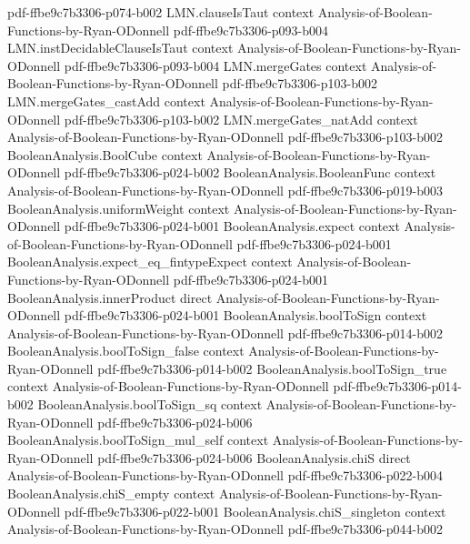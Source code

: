 \begin{lemma}
  {pdf-ffbe9c7b3306-p074-b002}
\proofstep
  {LMN.clauseIsTaut}
  {context}
  {Analysis-of-Boolean-Functions-by-Ryan-ODonnell}
  {pdf-ffbe9c7b3306-p093-b004}
\proofstep
  {LMN.instDecidableClauseIsTaut}
  {context}
  {Analysis-of-Boolean-Functions-by-Ryan-ODonnell}
  {pdf-ffbe9c7b3306-p093-b004}
\proofstep
  {LMN.mergeGates}
  {context}
  {Analysis-of-Boolean-Functions-by-Ryan-ODonnell}
  {pdf-ffbe9c7b3306-p103-b002}
\proofstep
  {LMN.mergeGates_castAdd}
  {context}
  {Analysis-of-Boolean-Functions-by-Ryan-ODonnell}
  {pdf-ffbe9c7b3306-p103-b002}
\proofstep
  {LMN.mergeGates_natAdd}
  {context}
  {Analysis-of-Boolean-Functions-by-Ryan-ODonnell}
  {pdf-ffbe9c7b3306-p103-b002}
\proofstep
  {BooleanAnalysis.BoolCube}
  {context}
  {Analysis-of-Boolean-Functions-by-Ryan-ODonnell}
  {pdf-ffbe9c7b3306-p024-b002}
\proofstep
  {BooleanAnalysis.BooleanFunc}
  {context}
  {Analysis-of-Boolean-Functions-by-Ryan-ODonnell}
  {pdf-ffbe9c7b3306-p019-b003}
\proofstep
  {BooleanAnalysis.uniformWeight}
  {context}
  {Analysis-of-Boolean-Functions-by-Ryan-ODonnell}
  {pdf-ffbe9c7b3306-p024-b001}
\proofstep
  {BooleanAnalysis.expect}
  {context}
  {Analysis-of-Boolean-Functions-by-Ryan-ODonnell}
  {pdf-ffbe9c7b3306-p024-b001}
\proofstep
  {BooleanAnalysis.expect_eq_fintypeExpect}
  {context}
  {Analysis-of-Boolean-Functions-by-Ryan-ODonnell}
  {pdf-ffbe9c7b3306-p024-b001}
\proofstep
  {BooleanAnalysis.innerProduct}
  {direct}
  {Analysis-of-Boolean-Functions-by-Ryan-ODonnell}
  {pdf-ffbe9c7b3306-p024-b001}
\proofstep
  {BooleanAnalysis.boolToSign}
  {context}
  {Analysis-of-Boolean-Functions-by-Ryan-ODonnell}
  {pdf-ffbe9c7b3306-p014-b002}
\proofstep
  {BooleanAnalysis.boolToSign_false}
  {context}
  {Analysis-of-Boolean-Functions-by-Ryan-ODonnell}
  {pdf-ffbe9c7b3306-p014-b002}
\proofstep
  {BooleanAnalysis.boolToSign_true}
  {context}
  {Analysis-of-Boolean-Functions-by-Ryan-ODonnell}
  {pdf-ffbe9c7b3306-p014-b002}
\proofstep
  {BooleanAnalysis.boolToSign_sq}
  {context}
  {Analysis-of-Boolean-Functions-by-Ryan-ODonnell}
  {pdf-ffbe9c7b3306-p024-b006}
\proofstep
  {BooleanAnalysis.boolToSign_mul_self}
  {context}
  {Analysis-of-Boolean-Functions-by-Ryan-ODonnell}
  {pdf-ffbe9c7b3306-p024-b006}
\proofstep
  {BooleanAnalysis.chiS}
  {direct}
  {Analysis-of-Boolean-Functions-by-Ryan-ODonnell}
  {pdf-ffbe9c7b3306-p022-b004}
\proofstep
  {BooleanAnalysis.chiS_empty}
  {context}
  {Analysis-of-Boolean-Functions-by-Ryan-ODonnell}
  {pdf-ffbe9c7b3306-p022-b001}
\proofstep
  {BooleanAnalysis.chiS_singleton}
  {context}
  {Analysis-of-Boolean-Functions-by-Ryan-ODonnell}
  {pdf-ffbe9c7b3306-p044-b002}

\end{lemma}
